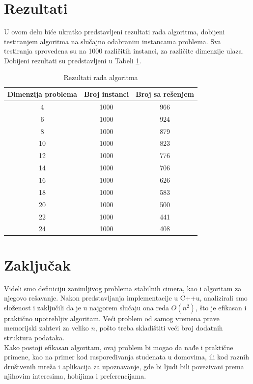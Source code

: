 \documentclass[a4paper]{article}
\begin{document}
\section{Rezultati}
U ovom delu biće ukratko predstavljeni rezultati rada algoritma, dobijeni testiranjem algoritma na slučajno odabranim instancama problema. Sva testiranja sprovedena su na 1000 različitih instanci, za različite dimenzije ulaza. Dobijeni rezultati su predstavljeni u Tabeli \ref{tab:problemi}.

\begin{table}[htbp]
  \centering
  \begin{tabular}{ccc}
    \toprule
    Dimenzija problema & Broj instanci & Broj sa rešenjem \\
    \midrule
    4 & 1000 & 966 \\
    6 & 1000 & 924 \\
    8 & 1000 & 879 \\
    10 & 1000 & 823 \\
    12 & 1000 & 776 \\
    14 & 1000 & 706 \\
    16 & 1000 & 626 \\
    18 & 1000 & 583 \\
    20 & 1000 & 500 \\
    22 & 1000 & 441 \\
    24 & 1000 & 408 \\
    \bottomrule
  \end{tabular}
  \caption{Rezultati rada algoritma}
  \label{tab:problemi}
\end{table}

\section{Zaključak}
\label{sec:zakljucak}

Videli smo definiciju zanimljivog problema stabilnih cimera, kao i algoritam za njegovo rešavanje. Nakon predstavljanja implementacije u C++u, analizirali smo složenost i zaključili da je u najgorem slučaju ona reda $O(n^2)$, što je efikasan i praktično upotrebljiv algoritam. Veći problem od samog vremena prave memorijski zahtevi za veliko $n$, pošto treba skladištiti veći broj dodatnih struktura podataka.\\
Kako postoji efikasan algoritam, ovaj problem bi mogao da nađe i praktične primene, kao na primer kod raspoređivanja studenata u domovima, ili kod raznih društvenih mreža i aplikacija za upoznavanje, gde bi ljudi bili povezivani prema njihovim interesima, hobijima i preferencijama.




\appendix
 

\end{document}
